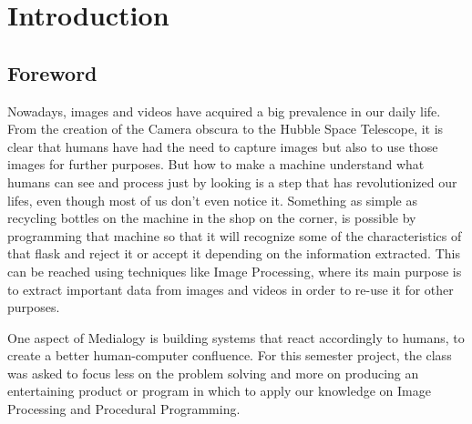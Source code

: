 \chapter{Introduction}
\section{Foreword}
Nowadays, images and videos have acquired a big prevalence in our daily life. From the creation of the Camera obscura to the Hubble Space Telescope, it is clear that humans have had the need to capture images but also to use those images for further purposes. But how to make a machine understand what humans can see and process just by looking is a step that has revolutionized our lifes, even though most of us don't even notice it. Something as simple as recycling bottles on the machine in the shop on the corner, is possible by programming that machine so that it will recognize some of the characteristics of that flask and reject it or accept it depending on the information extracted. This can be reached using techniques like Image Processing, where its main purpose is to extract important data from images and videos in order to re-use it for other purposes.

One aspect of Medialogy is building systems that react accordingly to humans, to create a better human-computer confluence. For this semester project, the class was asked to focus less on the problem solving and more on producing an entertaining product or program in which to apply our knowledge on Image Processing and Procedural Programming.




